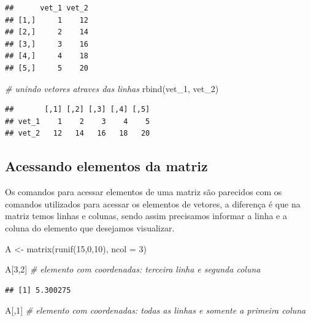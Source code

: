 \documentclass[
]{book}
\newenvironment{Shaded}{\begin{snugshade}}{\end{snugshade}}
\newcommand{\AttributeTok}[1]{\textcolor[rgb]{0.77,0.63,0.00}{#1}}
\newcommand{\CommentTok}[1]{\textcolor[rgb]{0.56,0.35,0.01}{\textit{#1}}}
\newcommand{\DecValTok}[1]{\textcolor[rgb]{0.00,0.00,0.81}{#1}}
\newcommand{\FunctionTok}[1]{\textcolor[rgb]{0.00,0.00,0.00}{#1}}
\newcommand{\NormalTok}[1]{#1}
\newcommand{\OtherTok}[1]{\textcolor[rgb]{0.56,0.35,0.01}{#1}}
\begin{document}
\begin{verbatim}
##      vet_1 vet_2
## [1,]     1    12
## [2,]     2    14
## [3,]     3    16
## [4,]     4    18
## [5,]     5    20
\end{verbatim}

\begin{Shaded}
\begin{Highlighting}[]
\CommentTok{\# unindo vetores atraves das linhas}
\FunctionTok{rbind}\NormalTok{(vet\_1, vet\_2)}
\end{Highlighting}
\end{Shaded}

\begin{verbatim}
##       [,1] [,2] [,3] [,4] [,5]
## vet_1    1    2    3    4    5
## vet_2   12   14   16   18   20
\end{verbatim}

\hypertarget{acessando-elementos-da-matriz}{%
\subsection{Acessando elementos da matriz}\label{acessando-elementos-da-matriz}}

Os comandos para acessar elementos de uma matriz são parecidos com os comandos utilizados para acessar os elementos de vetores, a diferença é que na matriz temos linhas e colunas, sendo assim precisamos informar a linha e a coluna do elemento que desejamos visualizar.

\begin{Shaded}
\begin{Highlighting}[]
\NormalTok{A }\OtherTok{\textless{}{-}} \FunctionTok{matrix}\NormalTok{(}\FunctionTok{runif}\NormalTok{(}\DecValTok{15}\NormalTok{,}\DecValTok{0}\NormalTok{,}\DecValTok{10}\NormalTok{), }\AttributeTok{ncol =} \DecValTok{3}\NormalTok{)}

\NormalTok{A[}\DecValTok{3}\NormalTok{,}\DecValTok{2}\NormalTok{] }\CommentTok{\# elemento com coordenadas: terceira linha  e segunda coluna}
\end{Highlighting}
\end{Shaded}

\begin{verbatim}
## [1] 5.300275
\end{verbatim}

\begin{Shaded}
\begin{Highlighting}[]
\NormalTok{A[,}\DecValTok{1}\NormalTok{] }\CommentTok{\# elemento com coordenadas: todas as linhas e somente a primeira coluna}
\end{Highlighting}
\end{Shaded}
\end{document}
